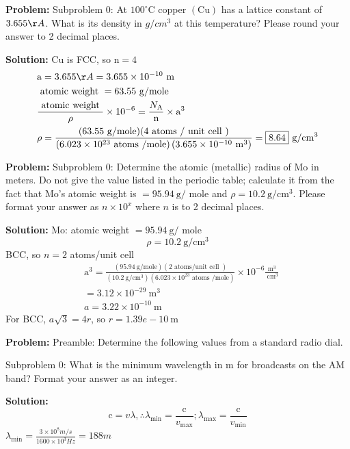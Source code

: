 \documentclass[10pt]{article}
\begin{document}
\textbf{Problem:}
Subproblem 0: At $100^{\circ} \mathrm{C}$ copper $(\mathrm{Cu})$ has a lattice constant of $3.655 \AA$. What is its density in $g/cm^3$ at this temperature? Please round your answer to 2 decimal places.


\textbf{Solution:}
$\mathrm{Cu}$ is FCC, so $\mathrm{n}=4$
\[
\begin{aligned}
&\mathrm{a}=3.655 \AA=3.655 \times 10^{-10} \mathrm{~m} \\
&\text { atomic weight }=63.55 \mathrm{~g} / \mathrm{mole} \\
&\frac{\text { atomic weight }}{\rho} \times 10^{-6}=\frac{N_{\mathrm{A}}}{\mathrm{n}} \times \mathrm{a}^{3} \\
&\rho=\frac{(63.55 \mathrm{~g} / \mathrm{mole})(4 \text { atoms } / \text { unit cell })}{\left(6.023 \times 10^{23} \text { atoms } / \mathrm{mole}\right)\left(3.655 \times 10^{-10} \mathrm{~m}^{3}\right)}= \boxed{8.64} \mathrm{~g} / \mathrm{cm}^{3}
\end{aligned}
\]


\textbf{Problem:}
Subproblem 0: Determine the atomic (metallic) radius of Mo in meters. Do not give the value listed in the periodic table; calculate it from the fact that Mo's atomic weight is $=95.94 \mathrm{~g} /$ mole and $\rho=10.2 \mathrm{~g} / \mathrm{cm}^{3}$. Please format your answer as $n \times 10^x$ where $n$ is to 2 decimal places.


\textbf{Solution:}
Mo: atomic weight $=95.94 \mathrm{~g} /$ mole
\[
\rho=10.2 \mathrm{~g} / \mathrm{cm}^{3}
\]
BCC, so $n=2$ atoms/unit cell
\[
\begin{aligned}
&\mathrm{a}^{3}=\frac{(95.94 \mathrm{~g} / \mathrm{mole})(2 \text { atoms/unit cell })}{\left(10.2 \mathrm{~g} / \mathrm{cm}^{3}\right)\left(6.023 \times 10^{23} \text { atoms } / \mathrm{mole}\right)} \times 10^{-6} \frac{\mathrm{m}^{3}}{\mathrm{~cm}^{3}} \\
&=3.12 \times 10^{-29} \mathrm{~m}^{3} \\
&a=3.22 \times 10^{-10} \mathrm{~m}
\end{aligned}
\]
For BCC, $a \sqrt{3}=4 r$, so $r= \boxed{1.39e-10} \mathrm{~m}$


\textbf{Problem:}
Preamble: Determine the following values from a standard radio dial. 

Subproblem 0: What is the minimum wavelength in m for broadcasts on the AM band? Format your answer as an integer. 


\textbf{Solution:}
\[
\mathrm{c}=v \lambda, \therefore \lambda_{\min }=\frac{\mathrm{c}}{v_{\max }} ; \lambda_{\max }=\frac{\mathrm{c}}{v_{\min }}
\]
$\lambda_{\min }=\frac{3 \times 10^{8} m / s}{1600 \times 10^{3} Hz}=\boxed{188} m$
\end{document}
